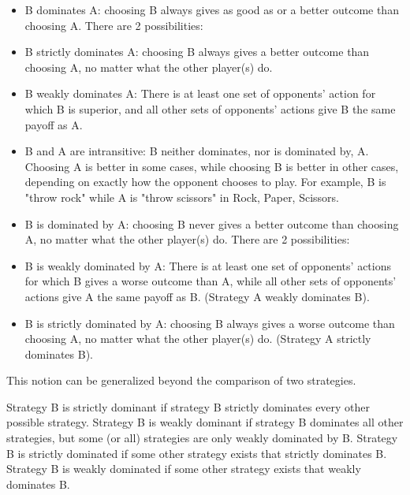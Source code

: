 \documentclass[]{report}
\begin{document}
\begin{itemize}
\item B dominates A: choosing B always gives as good as or a better outcome than choosing A. There are 2 possibilities:
\item B strictly dominates A: choosing B always gives a better outcome than choosing A, no matter what the other player(s) do.
\item B weakly dominates A: There is at least one set of opponents' action for which B is superior, and all other sets of opponents' actions give B the same payoff as A.
\item B and A are intransitive: B neither dominates, nor is dominated by, A. Choosing A is better in some cases, while choosing B is better in other cases, depending on exactly how the opponent chooses to play. For example, B is "throw rock" while A is "throw scissors" in Rock, Paper, Scissors.
\item B is dominated by A: choosing B never gives a better outcome than choosing A, no matter what the other player(s) do. There are 2 possibilities:
\item B is weakly dominated by A: There is at least one set of opponents' actions for which B gives a worse outcome than A, while all other sets of opponents' actions give A the same payoff as B. (Strategy A weakly dominates B).
\item B is strictly dominated by A: choosing B always gives a worse outcome than choosing A, no matter what the other player(s) do. (Strategy A strictly dominates B).
\end{itemize}
This notion can be generalized beyond the comparison of two strategies.

Strategy B is strictly dominant if strategy B strictly dominates every other possible strategy.
Strategy B is weakly dominant if strategy B dominates all other strategies, but some (or all) strategies are only weakly dominated by B.
Strategy B is strictly dominated if some other strategy exists that strictly dominates B.
Strategy B is weakly dominated if some other strategy exists that weakly dominates B.
\end{document}
